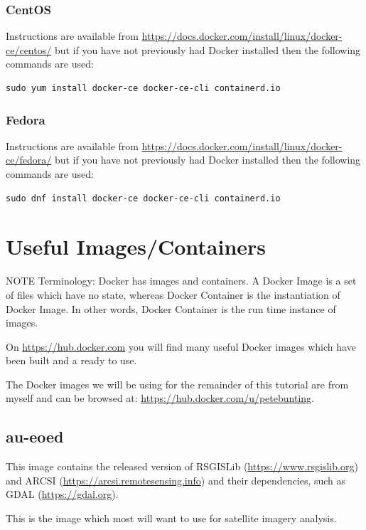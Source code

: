 \documentclass[authoryear, 11pt, oneside]{report}
\begin{document}
\subsubsection{CentOS}
 Instructions are available from \url{https://docs.docker.com/install/linux/docker-ce/centos/} but if you have not previously had Docker installed then the following commands are used:
 
\begin{verbatim}
sudo yum install docker-ce docker-ce-cli containerd.io
\end{verbatim}

\subsubsection{Fedora}
 Instructions are available from \url{https://docs.docker.com/install/linux/docker-ce/fedora/} but if you have not previously had Docker installed then the following commands are used:
 
\begin{verbatim}
sudo dnf install docker-ce docker-ce-cli containerd.io
\end{verbatim}

\section{Useful Images/Containers}

NOTE Terminology: Docker has images and containers. A Docker Image is a set of files which have no state, whereas Docker Container is the instantiation of Docker Image. In other words, Docker Container is the run time instance of images.

On \url{https://hub.docker.com} you will find many useful Docker images which have been built and a ready to use.

The Docker images we will be using for the remainder of this tutorial are from myself and can be browsed at: \url{https://hub.docker.com/u/petebunting}.

\subsection{au-eoed}

This image contains the released version of RSGISLib (\url{https://www.rsgislib.org}) and ARCSI (\url{https://arcsi.remotesensing.info}) and their dependencies, such as GDAL (\url{https://gdal.org}). 

This is the image which most will want to use for satellite imagery analysis.
\end{document}
